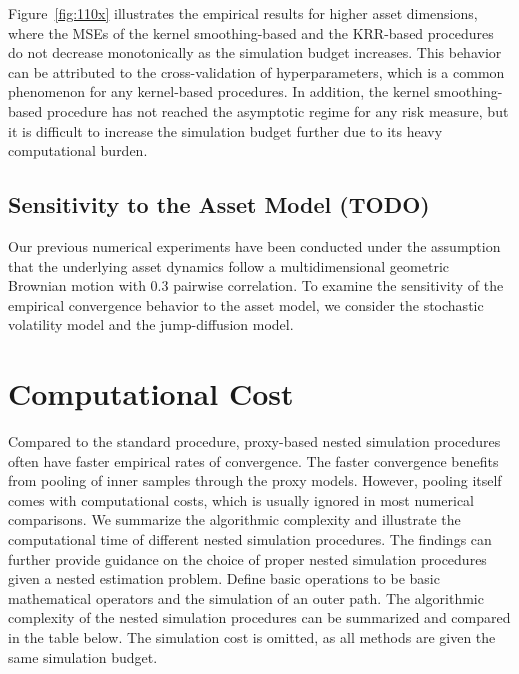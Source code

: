 \documentclass{article}
\begin{document}
Figure~\ref{fig:110x} illustrates the empirical results for higher asset dimensions, where the MSEs of the kernel smoothing-based and the KRR-based procedures do not decrease monotonically as the simulation budget increases.
This behavior can be attributed to the cross-validation of hyperparameters, which is a common phenomenon for any kernel-based procedures.
In addition, the kernel smoothing-based procedure has not reached the asymptotic regime for any risk measure, but it is difficult to increase the simulation budget further due to its heavy computational burden.

\subsection{Sensitivity to the Asset Model (TODO)} \label{sec:sensitivity-model}

Our previous numerical experiments have been conducted under the assumption that the underlying asset dynamics follow a multidimensional geometric Brownian motion with $0.3$ pairwise correlation.
To examine the sensitivity of the empirical convergence behavior to the asset model, we consider the stochastic volatility model and the jump-diffusion model.

\section{Computational Cost}
Compared to the standard procedure, proxy-based nested simulation procedures often have faster empirical rates of convergence.
The faster convergence benefits from pooling of inner samples through the proxy models. 
However, pooling itself comes with computational costs, which is usually ignored in most numerical comparisons. 
We summarize the algorithmic complexity and illustrate the computational time of different nested simulation procedures.
The findings can further provide guidance on the choice of proper nested simulation procedures given a nested estimation problem.
Define basic operations to be basic mathematical operators and the simulation of an outer path. 
The algorithmic complexity of the nested simulation procedures can be summarized and compared in the table below. 
The simulation cost is omitted, as all methods are given the same simulation budget. 
\end{document}
